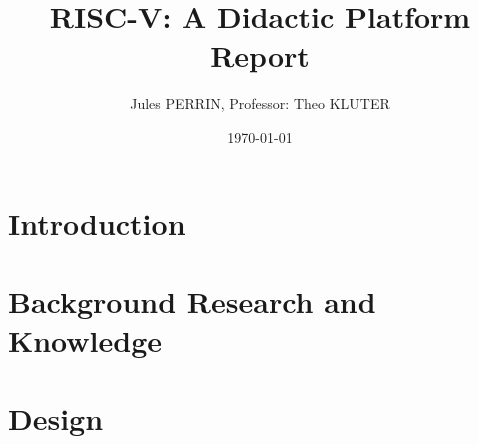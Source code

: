 \documentclass[12pt]{article}
\title{RISC-V: A Didactic Platform \\
Report}
\author{Jules PERRIN, Professor: Theo KLUTER}
\date{\today}
\begin{document}
\maketitle
\tableofcontents

\section{Introduction}




\section{Background Research and Knowledge}






\section{Design}





\printbibliography[heading=bibintoc]
\end{document}
